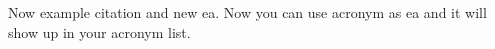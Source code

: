 
\Blinddocument 
{}  Now example citation \cite{Suratekar2018} and new \gls{ea}. Now you can use acronym as \gls{ea} and it will show up in your acronym list. 

\clearpage
